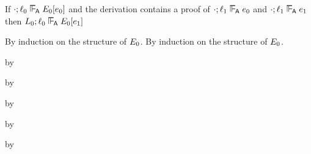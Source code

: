 \begin{lemma}\label{A-label-replacement}
  If\/ $\snil; \sowner_0 \sWLA \ctx_0[\sexpr_0]$
  and the derivation contains a proof of\/ $\snil; \sowner_1 \sWLA \sexpr_0$
  and\/ $\snil; \sowner_1 \sWLA \sexpr_1$
  then\/ $\sownerenv_0; \sowner_0 \sWLA \ctx_0[\sexpr_1]$
\end{lemma}{
\newcommand{\shortproof}{By induction on the structure of $\ctx_0$.}
\begin{lamportproof*}
  \shortproof
\mainproof
  \shortproof

    \begin{pfproof}
      \qedstep
    \end{pfproof}

    \begin{pfproof}
      \qedstep
        \begin{pfproof}
          by \pfih
        \end{pfproof}
    \end{pfproof}

    \begin{pfproof}
      \qedstep
        \begin{pfproof}
          by \pfih
        \end{pfproof}
    \end{pfproof}

    \begin{pfproof}
      \qedstep
        \begin{pfproof}
          by \pfih
        \end{pfproof}
    \end{pfproof}

    \begin{pfproof}
      \qedstep
        \begin{pfproof}
          by \pfih
        \end{pfproof}
    \end{pfproof}

    \begin{pfproof}
      \qedstep
        \begin{pfproof}
          by \pfih
        \end{pfproof}
    \end{pfproof}


\end{lamportproof*}}
